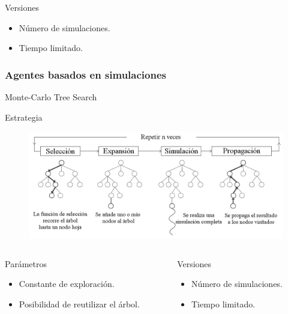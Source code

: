 \documentclass[10pt]{beamer}
\begin{document}
\begin{frame}[squeeze]
{\footnotesize 
\begin{exampleblock}{Versiones}
\begin{itemize}
	\item Número de simulaciones.
	\item Tiempo limitado.
\end{itemize}
\end{exampleblock}
}
\end{frame}

\begin{frame}[squeeze]
\frametitle{Agentes basados en simulaciones}

{\huge Monte-Carlo Tree Search}
\begin{block}{Estrategia}
{\small
\begin{figure}[t]
\centering
\includegraphics[scale=0.35]{imagenes/montecarloTS.png}
\label{fig:jug_montecarloTS}
\end{figure}
}
\end{block}

{\footnotesize 
\begin{columns}
\begin{column}{0.5\linewidth}
\begin{exampleblock}{Parámetros}
\begin{itemize}
	\item Constante de exploración.
	\item Posibilidad de reutilizar el árbol.
\end{itemize}
\end{exampleblock}
\end{column}
\begin{column}{0.5\linewidth}
\begin{exampleblock}{Versiones}
\begin{itemize}
	\item Número de simulaciones.
	\item Tiempo limitado.
\end{itemize}
\end{exampleblock}
\end{column}
\end{columns}
}
\end{frame}
\end{document}
